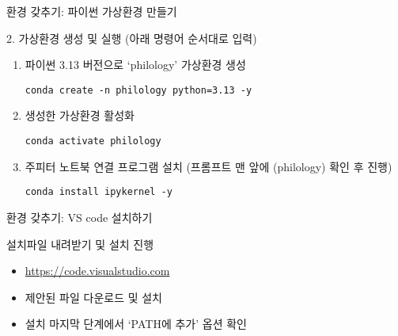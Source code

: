 \documentclass[11pt, aspectratio=169]{beamer}
\begin{document}
\begin{frame}[t, fragile]{환경 갖추기: 파이썬 가상환경 만들기}
  \begin{block}{2. 가상환경 생성 및 실행 (아래 명령어 순서대로 입력)}
        \begin{enumerate}
            \item 파이썬 3.13 버전으로 `philology' 가상환경 생성
            \begin{verbatim}
conda create -n philology python=3.13 -y
            \end{verbatim}
            \item 생성한 가상환경 활성화
            \begin{verbatim}
conda activate philology
            \end{verbatim}
            \item 주피터 노트북 연결 프로그램 설치 (프롬프트 맨 앞에 (philology) 확인 후 진행)
            \begin{verbatim}
conda install ipykernel -y
            \end{verbatim}
        \end{enumerate}    
  \end{block}  
\end{frame}

\begin{frame}[t]{환경 갖추기: VS code 설치하기}
  \begin{block}{설치파일 내려받기 및 설치 진행}
    \begin{itemize}
      \item \url{https://code.visualstudio.com}
      \item 제안된 파일 다운로드 및 설치
      \item 설치 마지막 단계에서 `PATH에 추가' 옵션 확인
    \end{itemize}
  \end{block}
\end{frame}
\end{document}
